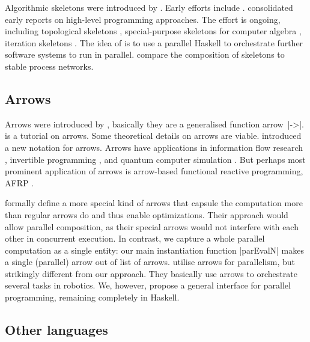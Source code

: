 Algorithmic skeletons were introduced by \citet{Cole1989}.
Early efforts include \cite{darlington1993parallel,botorog1996efficient,p3l97,Gorlatch1998,Lengauer1997}. \citet{SkeletonBook} consolidated early reports on high-level programming approaches.
The effort is ongoing, including topological skeletons \cite{Eden:PARCO05}, special-purpose skeletons for computer algebra \cite{Berthold2009-fft,lobachev-phd,Lobachev2012,janjic2013space}, iteration skeletons \cite{Dieterle2013}. The idea of \citet{scscp} is to use a parallel Haskell to orchestrate further software systems to run in parallel. \citet{dieterle_horstmeyer_loogen_berthold_2016} compare the composition of skeletons to stable process networks.

\subsection{Arrows}

Arrows were introduced by \citet{HughesArrows}, basically they are a generalised function arrow~|->|. \citet{Hughes2005} is a tutorial on arrows. Some theoretical details on arrows \cite{jacobs_heunen_hasuo_2009,LINDLEY201197,ATKEY201119} are viable. \citet{Paterson:2001:NNA:507669.507664} introduced a new notation for arrows. Arrows have applications in information flow research \cite{1648705,LI20101974,Russo:2008:LLI:1411286.1411289}, invertible programming \cite{Alimarine:2005:BAA:1088348.1088357}, and quantum computer simulation \cite{vizzotto_altenkirch_sabry_2006}. But perhaps most prominent application of arrows is arrow-based functional reactive programming, AFRP \cite{Hudak2003}.

\citet{Liu:2009:CCA:1631687.1596559} formally define a more special kind of arrows that capsule the computation more than regular arrows do and thus enable optimizations. Their approach would allow parallel composition, as their special arrows would not interfere with each other in concurrent execution. In contrast, we capture a whole parallel computation as a single entity: our main instantiation function |parEvalN| makes a single (parallel) arrow out of list of arrows.
\citet{Huang2007} utilise arrows for parallelism, but strikingly different from our approach. They basically use arrows to orchestrate several tasks in robotics. We, however, propose a general interface for parallel programming, remaining completely in Haskell.

\subsection{Other languages}

